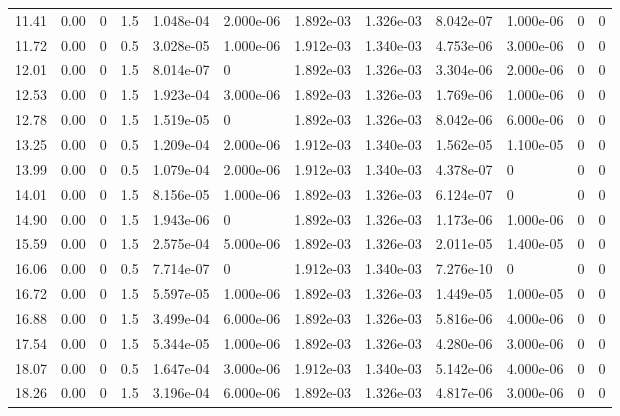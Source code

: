 \documentclass[preview]{standalone}
\begin{document}
{{\begin{tabular}{L{1.2cm}C{1.2cm} C{0.3cm}C{0.5cm} C{1.4cm}C{1.4cm} C{1.4cm}C{1.4cm} C{1.6cm}C{1.6cm} C{1.6cm}C{1.6cm}}
  11.41  &  0.00  & 0     & 1.5 &  1.048e-04  & 2.000e-06  &  1.892e-03&   1.326e-03& 8.042e-07 & 1.000e-06   &  0 & 0  \\ 
  11.72  &  0.00  & 0     & 0.5 &  3.028e-05  & 1.000e-06  &  1.912e-03&   1.340e-03& 4.753e-06 & 3.000e-06   &  0 & 0  \\ 
  12.01  &  0.00  & 0     & 1.5 &  8.014e-07  & 0  &  1.892e-03&   1.326e-03& 3.304e-06 & 2.000e-06   &  0 & 0  \\ 
  12.53  &  0.00  & 0     & 1.5 &  1.923e-04  & 3.000e-06  &  1.892e-03&   1.326e-03& 1.769e-06 & 1.000e-06   &  0 & 0  \\ 
  12.78  &  0.00  & 0     & 1.5 &  1.519e-05  & 0  &  1.892e-03&   1.326e-03& 8.042e-06 & 6.000e-06   &  0 & 0  \\ 
  13.25  &  0.00  & 0     & 0.5 &  1.209e-04  & 2.000e-06  &  1.912e-03&   1.340e-03& 1.562e-05 & 1.100e-05   &  0 & 0  \\ 
  13.99  &  0.00  & 0     & 0.5 &  1.079e-04  & 2.000e-06  &  1.912e-03&   1.340e-03& 4.378e-07 & 0   &  0 & 0  \\ 
  14.01  &  0.00  & 0     & 1.5 &  8.156e-05  & 1.000e-06  &  1.892e-03&   1.326e-03& 6.124e-07 & 0   &  0 & 0  \\ 
  14.90  &  0.00  & 0     & 1.5 &  1.943e-06  & 0  &  1.892e-03&   1.326e-03& 1.173e-06 & 1.000e-06   &  0 & 0  \\ 
  15.59  &  0.00  & 0     & 1.5 &  2.575e-04  & 5.000e-06  &  1.892e-03&   1.326e-03& 2.011e-05 & 1.400e-05   &  0 & 0  \\ 
  16.06  &  0.00  & 0     & 0.5 &  7.714e-07  & 0  &  1.912e-03&   1.340e-03& 7.276e-10 & 0   &  0 & 0  \\ 
  16.72  &  0.00  & 0     & 1.5 &  5.597e-05  & 1.000e-06  &  1.892e-03&   1.326e-03& 1.449e-05 & 1.000e-05   &  0 & 0  \\ 
  16.88  &  0.00  & 0     & 1.5 &  3.499e-04  & 6.000e-06  &  1.892e-03&   1.326e-03& 5.816e-06 & 4.000e-06   &  0 & 0  \\ 
  17.54  &  0.00  & 0     & 1.5 &  5.344e-05  & 1.000e-06  &  1.892e-03&   1.326e-03& 4.280e-06 & 3.000e-06   &  0 & 0  \\ 
  18.07  &  0.00  & 0     & 0.5 &  1.647e-04  & 3.000e-06  &  1.912e-03&   1.340e-03& 5.142e-06 & 4.000e-06   &  0 & 0  \\ 
  18.26  &  0.00  & 0     & 1.5 &  3.196e-04  & 6.000e-06  &  1.892e-03&   1.326e-03& 4.817e-06 & 3.000e-06   &  0 & 0  \\ 
\hline 
\end{tabular} 

}}
\end{document}
